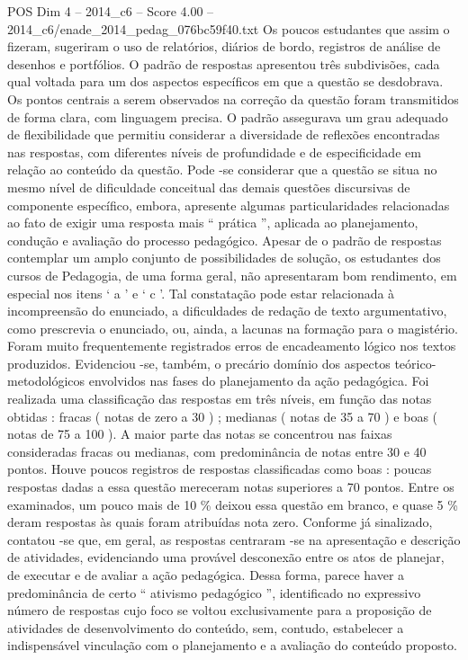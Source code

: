 \begin{textsample}{POS Dim 4 – 2014\_c6 – Score 4.00 – 2014\_c6/enade\_2014\_pedag\_076bc59f40.txt}
Os poucos estudantes que assim o fizeram, sugeriram o uso de relatórios, diários de bordo, registros de análise de desenhos e portfólios.
O padrão de respostas apresentou três subdivisões, cada qual voltada para um dos aspectos específicos em que a questão se desdobrava.
Os pontos centrais a serem observados na correção da questão foram transmitidos de forma clara, com linguagem precisa.
O padrão assegurava um grau adequado de flexibilidade que permitiu considerar a diversidade de reflexões encontradas nas respostas, com diferentes níveis de profundidade e de especificidade em relação ao conteúdo da questão.
Pode -se considerar que a questão se situa no mesmo nível de dificuldade conceitual das demais questões discursivas de componente específico, embora, apresente algumas particularidades relacionadas ao fato de exigir uma resposta mais “ prática ”, aplicada ao planejamento, condução e avaliação do processo pedagógico.
Apesar de o padrão de respostas contemplar um amplo conjunto de possibilidades de solução, os estudantes dos cursos de Pedagogia, de uma forma geral, não apresentaram bom rendimento, em especial nos itens ‘ a ’ e ‘ c ’.
Tal constatação pode estar relacionada à incompreensão do enunciado, a dificuldades de redação de texto argumentativo, como prescrevia o enunciado, ou, ainda, a lacunas na formação para o magistério.
Foram muito frequentemente registrados erros de encadeamento lógico nos textos produzidos.
Evidenciou -se, também, o precário domínio dos aspectos teórico-metodológicos envolvidos nas fases do planejamento da ação pedagógica.
Foi realizada uma classificação das respostas em três níveis, em função das notas obtidas : fracas ( notas de zero a 30 ) ; medianas ( notas de 35 a 70 ) e boas ( notas de 75 a 100 ).
A maior parte das notas se concentrou nas faixas consideradas fracas ou medianas, com predominância de notas entre 30 e 40 pontos.
Houve poucos registros de respostas classificadas como boas : poucas respostas dadas a essa questão mereceram notas superiores a 70 pontos.
Entre os examinados, um pouco mais de 10 \% deixou essa questão em branco, e quase 5 \% deram respostas às quais foram atribuídas nota zero.
Conforme já sinalizado, contatou -se que, em geral, as respostas centraram -se na apresentação e descrição de atividades, evidenciando uma provável desconexão entre os atos de planejar, de executar e de avaliar a ação pedagógica.
Dessa forma, parece haver a predominância de certo “ ativismo pedagógico ”, identificado no expressivo número de respostas cujo foco se voltou exclusivamente para a proposição de atividades de desenvolvimento do conteúdo, sem, contudo, estabelecer a indispensável vinculação com o planejamento e a avaliação do conteúdo proposto.

\end{textsample}
